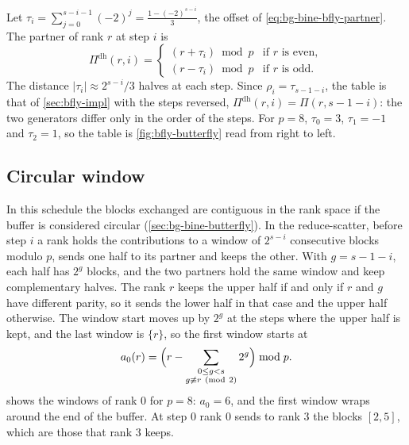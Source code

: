 Let $\tau_i=\sum_{j=0}^{s-i-1}(-2)^j=\frac{1-(-2)^{s-i}}{3}$, the offset of \cref{eq:bg-bine-bfly-partner}.
The partner of rank $r$ at step $i$ is
\begin{equation}
  \Pi^{\mathrm{dh}}(r,i)=
  \begin{cases}
    (r+\tau_i)\bmod p & \text{if $r$ is even},\\
    (r-\tau_i)\bmod p & \text{if $r$ is odd}.
  \end{cases}
  \label{eq:bfly-dhlv-partner}
\end{equation}
The distance $\lvert\tau_i\rvert\approx2^{s-i}/3$ halves at each step.
Since $\rho_i=\tau_{s-1-i}$, the table is that of \cref{sec:bfly-impl} with the steps reversed, $\Pi^{\mathrm{dh}}(r,i)=\Pi(r,s-1-i)$: the two generators differ only in the order of the steps.
For $p=8$, $\tau_0=3$, $\tau_1=-1$ and $\tau_2=1$, so the table is \cref{fig:bfly-butterfly} read from right to left.

\subsection{Circular window}

In this schedule the blocks exchanged are contiguous in the rank space if the buffer is considered circular (\cref{sec:bg-bine-butterfly}).
In the reduce-scatter, before step $i$ a rank holds the contributions to a window of $2^{s-i}$ consecutive blocks modulo $p$, sends one half to its partner and keeps the other.
With $g=s-1-i$, each half has $2^g$ blocks, and the two partners hold the same window and keep complementary halves.
The rank $r$ keeps the upper half if and only if $r$ and $g$ have different parity, so it sends the lower half in that case and the upper half otherwise.
The window start moves up by $2^g$ at the steps where the upper half is kept, and the last window is $\{r\}$, so the first window starts at
\begin{equation}
  a_0(r)=\Bigl(r-\sum_{\substack{0\le g<s\\ g\not\equiv r\ (\mathrm{mod}\ 2)}}2^g\Bigr)\bmod p .
  \label{eq:bfly-dhlv-start}
\end{equation}
 shows the windows of rank $0$ for $p=8$: $a_0=6$, and the first window wraps around the end of the buffer.
At step $0$ rank $0$ sends to rank $3$ the blocks $[2,5]$, which are those that rank $3$ keeps.

